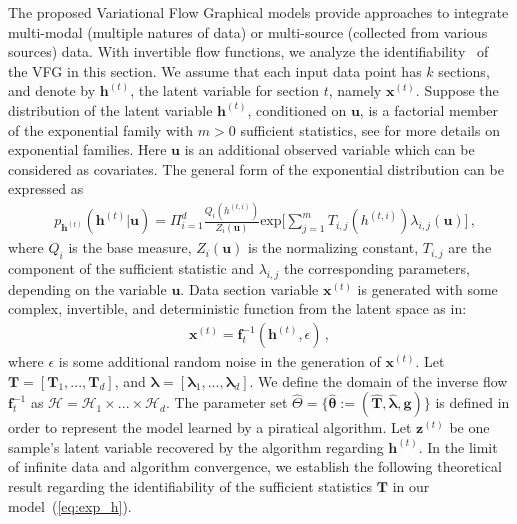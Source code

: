 \documentclass{article}
\begin{document}
The proposed Variational Flow Graphical models provide approaches to integrate multi-modal (multiple natures of data) or multi-source (collected from various sources) data. 
With invertible flow functions, we analyze the identifiability~\cite{Khemakhem20a,Sorrenson2020} of the VFG in this section.  
We assume that each input data point has $k$ sections, and denote by $\mathbf{h}^{(t)}$, the latent variable for section $t$, namely $\mathbf{x}^{(t)}$. 
Suppose the distribution of the latent variable $\mathbf{h}^{(t)}$, conditioned on $\mathbf{u}$, is a factorial member of the exponential family with $m > 0$ sufficient statistics, see \cite{efron1975defining} for more details on exponential families. 
Here $\mathbf{u}$ is an additional observed variable which can be considered as covariates.
The general form of the exponential distribution can be expressed as 
\begin{equation}\label{eq:exp_h}
\begin{split}
&p_{\mathbf{h}^{(t)}}(\mathbf{h}^{(t)} | \mathbf{u})  = \Pi_{i=1}^d \frac{Q_i(h^{(t,i)})}{Z_i(\mathbf{u})} \text{exp}\bigg[ \sum_{j=1}^m T_{i,j}(h^{(t,i)}) \lambda_{i,j}(\mathbf{u}) \bigg]\, ,
\end{split}
\end{equation} 
where $Q_i$ is the base measure, $Z_i(\mathbf{u})$ is the normalizing constant, $T_{i,j}$ are the component of the sufficient statistic and $\lambda_{i,j}$ the corresponding parameters, depending on the variable $\mathbf{u}$. 
Data section variable $\mathbf{x}^{(t)}$ is generated with some complex, invertible, and deterministic function from the latent space as in: 
\begin{align}\label{eq:xt_gen}
\mathbf{x}^{(t)} = \mathbf{f}^{-1}_t(\mathbf{h}^{(t)}, \epsilon)\, ,
\end{align}
where $\epsilon$ is some additional random noise in the generation of $\mathbf{x}^{(t)}$. 
Let $\mathbf{T} =[\mathbf{T}_1, ..., \mathbf{T}_d] $, and $\mathbf{\lambda} =[\mathbf{\lambda}_1, ..., \mathbf{\lambda}_d]$.  
 We define the domain of the inverse flow $\mathbf{f}_t^{-1}$ as $\mathcal{H}=\mathcal{H}_1 \times ... \times \mathcal{H}_d$.
The parameter set $\widehat{\Theta} = \{\widehat{\mathbf{\theta}} := (\widehat{\mathbf{T}}, \widehat{\mathbf{\lambda}}, \mathbf{g} ) \}$ is defined in order to represent the model learned by a piratical algorithm. Let $\mathbf{z}^{(t)}$ be one sample's latent variable recovered by the algorithm regarding $\mathbf{h}^{(t)}$.
In the limit of infinite data and algorithm convergence, we establish the following theoretical result regarding the identifiability of the sufficient statistics $\mathbf{T}$ in our model~(\ref{eq:exp_h}).
\end{document}
